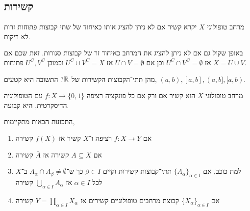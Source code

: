 \subsection{קשירות}
\begin{definition}[קשירות]
	מרחב טופולוגי $X$ יקרא קשיר אם לא ניתן להציג אותו כאיחוד של שתי קבוצות פתוחות זרות לא ריקות.
\end{definition}
\begin{remark}
	באופן שקול גם אם לא ניתן להציג את המרחב כאיחוד זר של קבוצות סגורות.
	זאת שכם אם $X = U \cup V$ אז $U^C \cap V^C = \emptyset$ וכן אם $U \cap V = \emptyset$ אז $U^C \cup V^C = X$ וכמובן $U^C, V^C$ פתוחות.
\end{remark}
\begin{example}
	מהן תתי־הקבוצות הקשירות של $\mathbb{R}$?
	התשובה היא קטעים, $(a, b), [a, b], (a, b], [a, b)$.
\end{example}
\begin{remark}
	מרחב טופולוגי $X$ הוא קשיר אם ורק אם כל פונקציה רציפה $f : X \to \{0, 1\}$ עם הטופולוגיה הדיסקרטית, היא קבועה.
\end{remark}
\begin{proposition}
	התכונות הבאות מתקיימות,
	\begin{enumerate}
		\item אם $f : X \to Y$ רציפה ו־$X$ קשיר אז $f(X)$ קשירה
		\item אם $A \subseteq X$ קשירה אז $\overline{A}$ קשירה
		\item למת כוכב, אם ${\{ A_{\alpha} \}}_{\alpha \in I}$ תתי־קבוצות קשירות וקיים $\beta \in I$ כך ש־$A_{\alpha} \cap A_{\beta} \ne \emptyset$ ב־$X$ לכל $\alpha \in I$ אז $\bigcup_{\alpha \in I} A_{\alpha}$ קשירה
		\item אם ${\{ X_{\alpha} \}}_{\alpha \in I}$ קבוצת מרחבים טופולוגיים קשירים אז $Y = \prod_{\alpha \in I} X_{\alpha}$ קשירה
	\end{enumerate}
\end{proposition}
